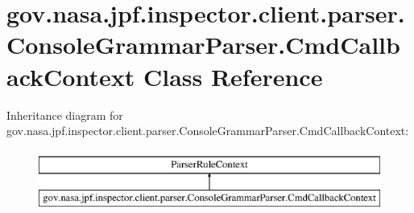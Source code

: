 \hypertarget{classgov_1_1nasa_1_1jpf_1_1inspector_1_1client_1_1parser_1_1_console_grammar_parser_1_1_cmd_callback_context}{}\section{gov.\+nasa.\+jpf.\+inspector.\+client.\+parser.\+Console\+Grammar\+Parser.\+Cmd\+Callback\+Context Class Reference}
\label{classgov_1_1nasa_1_1jpf_1_1inspector_1_1client_1_1parser_1_1_console_grammar_parser_1_1_cmd_callback_context}
Inheritance diagram for gov.\+nasa.\+jpf.\+inspector.\+client.\+parser.\+Console\+Grammar\+Parser.\+Cmd\+Callback\+Context\+:\begin{figure}[H]
\begin{center}
\leavevmode
\includegraphics[height=2.000000cm]{classgov_1_1nasa_1_1jpf_1_1inspector_1_1client_1_1parser_1_1_console_grammar_parser_1_1_cmd_callback_context}
\end{center}
\end{figure}
